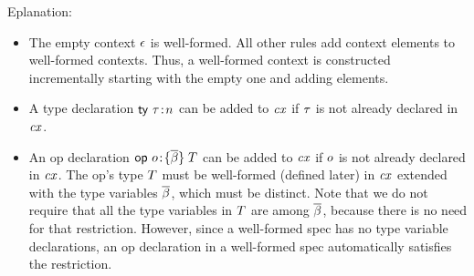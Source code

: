 Eplanation:
\begin{itemize}
\item
The empty context $\epsilon$ is well-formed. All other rules add context elements
to well-formed contexts. Thus, a well-formed context is constructed
incrementally starting with the empty one and adding elements.
\item
A type declaration $\mathsf{ty}\ \tau\!:\!n$ can be added to $\mathit{cx}$ if $\tau$ is not already
declared in $\mathit{cx}$.
\item
An op declaration $\mathsf{op}\ o\!:\!\{\overline{\beta}\}\;T$ can be added to $\mathit{cx}$ if $o$ is not already
declared in $\mathit{cx}$. The op's type $T$ must be well-formed (defined later) in
$\mathit{cx}$ extended with the type variables $\overline{\beta}$, which must be distinct. Note
that we do not require that all the type variables in $T$ are among
$\overline{\beta}$, because there is no need for that restriction. However, since a
well-formed spec has no type variable declarations, an op declaration in a
well-formed spec automatically satisfies the restriction.

\end{itemize}
